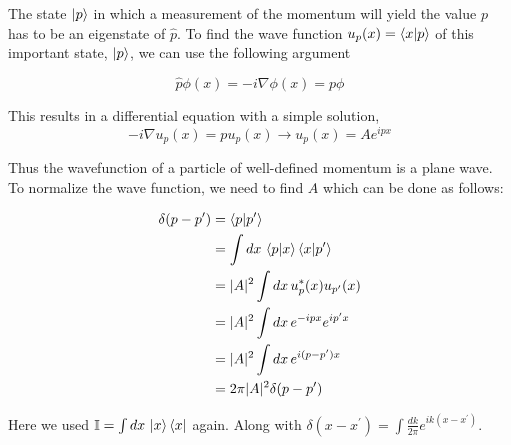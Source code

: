 The state $\ket{p}$ in which a measurement of the momentum will yield the value $p$ has to be an eigenstate
of $\hat{p}$.
To find the wave function $u_p (x) = \braket{x | p}$ of this important state, $\ket{p}$,
we can use the following argument

$$
\hat{p} \phi(x) = -i\nabla \phi(x) = p\phi
$$

This results in a differential equation with a simple solution,
$$
-i\nabla u_p(x) = p u_p(x) \rightarrow u_p(x) = Ae^{ipx}
$$

Thus the wavefunction of a particle of well-defined momentum is a plane wave.
To normalize the wave function, we need to find $A$ which can be done as follows:

\begin{align*}
\delta(p - p^\prime) &= \braket{p | p^\prime} \\
&= \int dx \, \braket{p | x} \braket{x | p^\prime} \\
&= |A|^2 \int dx \, u_{p}^{*} (x) u_{p^\prime} (x) \\
&= |A|^2 \int dx \, e^{-ipx} e^{ip^\prime x} \\
&= |A|^2 \int dx \, e^{i(p - p^\prime) x} \\
&= 2\pi |A|^2 \delta(p - p^\prime)
\end{align*}

Here we used $\mathbb{I} = \int dx \, \ket{x}\bra{x}$ again.
Along with $\delta(x-x^\prime) = \int \frac{dk}{2\pi} e^{ik(x-x^\prime)}$.
